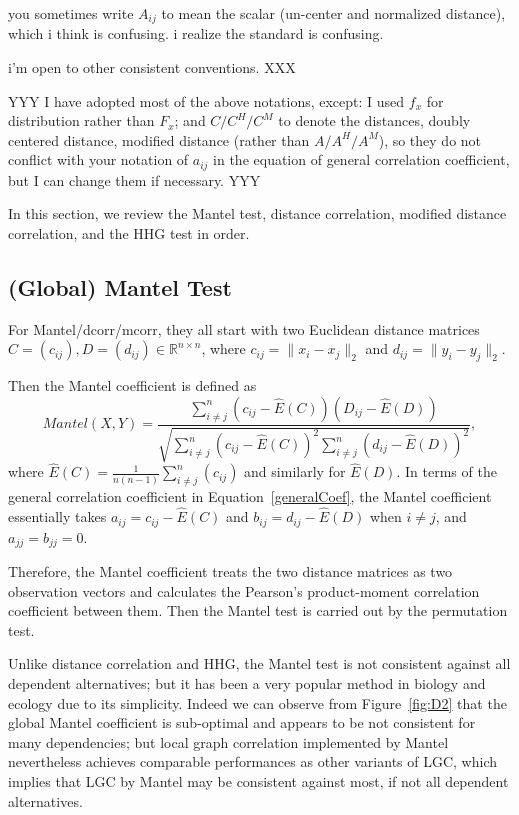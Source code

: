 \documentclass[11pt]{article}
\newcommand{\Real}{\mathbb{R}}
\begin{document}
you sometimes write $A_{ij}$ to mean the scalar (un-center and normalized distance), which i think is confusing. i realize the standard is confusing.

i'm open to other consistent conventions.
XXX

YYY
I have adopted most of the above notations, except: I used $f_{x}$ for distribution rather than $F_{x}$; and $C/C^{H}/C^{M}$ to denote the distances, doubly centered distance, modified distance (rather than $A/A^{H}/A^{M}$), so they do not conflict with your notation of $a_{ij}$ in the equation of general correlation coefficient, but I can change them if necessary.
YYY

In this section, we review the Mantel test, distance correlation, modified distance correlation, and the HHG test in order.

\subsection{(Global) Mantel Test}
\label{sec:mantel}
For Mantel/dcorr/mcorr, they all start with two Euclidean distance matrices $C=(c_{ij}), D=(d_{ij}) \in \Real^{n \times n}$, where $c_{ij}=\|x_{i}-x_{j}\|_{2}$ and $d_{ij}=\|y_{i}-y_{j}\|_{2}$. 

Then the Mantel coefficient \cite{Mantel1967} is defined as 
\begin{equation}
Mantel(X,Y)=\frac{\sum_{i \neq j}^{n}(c_{ij}-\hat{E}(C))(D_{ij}-\hat{E}(D))}{\sqrt{\sum_{i \neq j}^{n}(c_{ij}-\hat{E}(C))^2 \sum_{i \neq j}^{n}(d_{ij}-\hat{E}(D))^2}},
\end{equation}
where $\hat{E}(C)=\frac{1}{n(n-1)}\sum_{i \neq j}^{n}(c_{ij})$ and similarly for $\hat{E}(D)$. In terms of the general correlation coefficient in Equation~\ref{generalCoef}, the Mantel coefficient essentially takes $a_{ij}=c_{ij}-\hat{E}(C)$ and $b_{ij}=d_{ij}-\hat{E}(D)$ when $i \neq j$, and $a_{jj}=b_{jj}=0$.

Therefore, the Mantel coefficient treats the two distance matrices as two observation vectors and calculates the Pearson's product-moment correlation coefficient between them. Then the Mantel test is carried out by the permutation test.

Unlike distance correlation and HHG, the Mantel test is not consistent against all dependent alternatives; but it has been a very popular method in biology and ecology due to its simplicity. Indeed we can observe from Figure~\ref{fig:D2} that the global Mantel coefficient is sub-optimal and appears to be not consistent for many dependencies; but local graph correlation implemented by Mantel nevertheless achieves comparable performances as other variants of LGC, which implies that LGC by Mantel may be consistent against most, if not all dependent alternatives.
\end{document}
